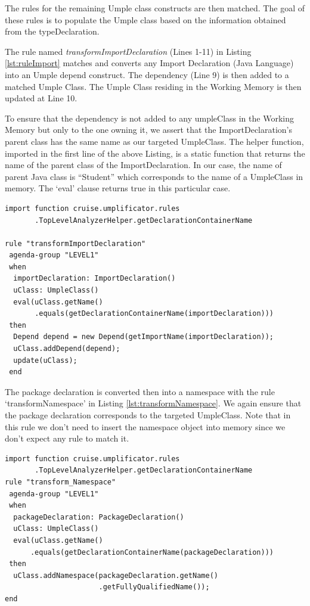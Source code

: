 The rules for the remaining Umple class constructs are then matched. The goal of these rules is to populate the Umple class based on the information obtained from the typeDeclaration. 

The rule named \textit{transformImportDeclaration} (Lines 1-11) in Listing \ref{lst:ruleImport} matches and converts any Import Declaration (Java Language) into an Umple depend construct. The dependency (Line 9) is then added to a matched Umple Class. The Umple Class residing in the Working Memory is then updated at Line 10.

To ensure that the dependency is not added to any umpleClass in the Working Memory but only to the one owning it, we assert that the ImportDeclaration's parent class has the same name as our targeted UmpleClass. The helper function, imported in the first line of the above Listing, is a static function that returns the name of the parent class of the ImportDeclaration. In our case, the name of parent Java class is ``Student'' which corresponds to the name of a UmpleClass in memory. The `eval' clause returns true in this particular case.

\begin{lstlisting}[language={drools},label={lst:ruleImport}, caption=Rule transformImportDeclaration]
import function cruise.umplificator.rules
       .TopLevelAnalyzerHelper.getDeclarationContainerName
      
rule "transformImportDeclaration"
 agenda-group "LEVEL1" 
 when
  importDeclaration: ImportDeclaration()
  uClass: UmpleClass()
  eval(uClass.getName()
       .equals(getDeclarationContainerName(importDeclaration)))		
 then
  Depend depend = new Depend(getImportName(importDeclaration));
  uClass.addDepend(depend);
  update(uClass);
 end
\end{lstlisting}

The package declaration is converted then into a namespace with the rule `transformNamespace' in Listing \ref{lst:transformNamespace}. We again ensure that the package declaration corresponds to the targeted UmpleClass. Note that in this rule we don't need to insert the namespace object into memory since we don't expect any rule to match it.

\begin{lstlisting}[language={drools},label={lst:transformNamespace}, caption=Rule transformNamespace]
import function cruise.umplificator.rules
       .TopLevelAnalyzerHelper.getDeclarationContainerName
rule "transform_Namespace"
 agenda-group "LEVEL1" 
 when
  packageDeclaration: PackageDeclaration()
  uClass: UmpleClass()
  eval(uClass.getName()
      .equals(getDeclarationContainerName(packageDeclaration)))	
 then
  uClass.addNamespace(packageDeclaration.getName()
                      .getFullyQualifiedName());
end
\end{lstlisting}

